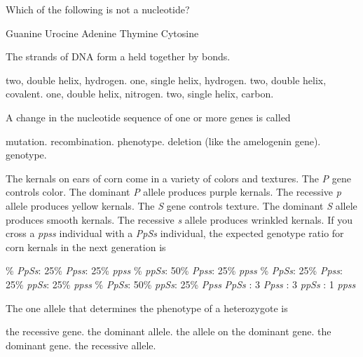 \question
Which of the following is not a nucleotide?

\begin{choices}
\choice Guanine
\correctchoice Urocine
\choice Adenine
\choice Thymine
\choice Cytosine
\end{choices}

\question
The \underline{\hspace{2cm}} strands of DNA form a \underline{\hspace{2cm}} held together by \underline{\hspace{2cm}} bonds.

\begin{choices}
\correctchoice two, double helix, hydrogen.
\choice one, single helix, hydrogen.
\choice two, double helix, covalent.
\choice one, double helix, nitrogen.
\choice two, single helix, carbon.
\end{choices}

\question
A change in the nucleotide sequence of one or more genes is called

\begin{choices}
\correctchoice mutation.
\choice recombination.
\choice phenotype.
\choice deletion (like the amelogenin gene).
\choice genotype.
\end{choices}

\question
The kernals on ears of corn come in a variety of colors and textures. The \textit{P} gene controls color.  The dominant \textit{P} allele produces purple kernals. The recessive \textit{p} allele produces yellow kernals.  The \textit{S} gene controls texture. The dominant \textit{S} allele produces smooth kernals. The recessive \textit{s} allele produces wrinkled kernals. If you cross a \textit{ppss} individual with a \textit{PpSs} individual, the expected genotype ratio for corn kernals in the next generation is 

\begin{choices}
\% \textit{PpSs}: 25\% \textit{Ppss}: 25\% \textit{ppss}
\% \textit{ppSs}: 50\% \textit{Ppss}: 25\% \textit{ppss}
\% \textit{PpSs}: 25\% \textit{Ppss}: 25\% \textit{ppSs}: 25\% \textit{ppss}
\% \textit{PpSs}: 50\% \textit{ppSs}: 25\% \textit{Ppss}
 \textit{PpSs} : 3 \textit{Ppss} : 3 \textit{ppSs} : 1 \textit{ppss}
\end{choices}

\question
The one allele that determines the phenotype of a heterozygote is

\begin{choices}
\choice the recessive gene.
\correctchoice the dominant allele.
\choice the allele on the dominant gene.
\choice the dominant gene.
\choice the recessive allele.
\end{choices}

